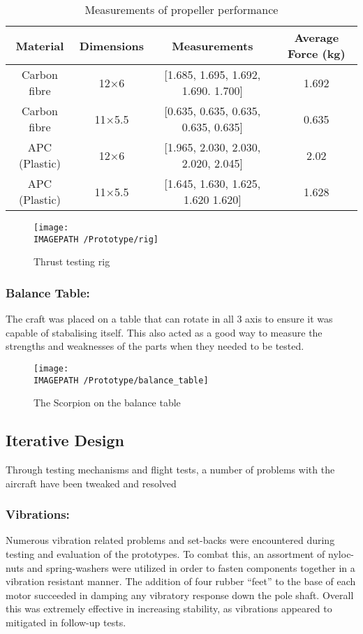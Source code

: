 \begin{table}[htbp]
	\centering
	\begin{tabular}{|c|c|c|c|}
		\hline Material & Dimensions & Measurements & Average Force (kg) \\ 
		\hline Carbon fibre & 12$\times$6 & [1.685, 1.695, 1.692, 1.690. 1.700] & 1.692 \\ 
		\hline Carbon fibre & 11$\times$5.5 & [0.635, 0.635, 0.635, 0.635, 0.635] & 0.635 \\ 
		\hline APC (Plastic) & 12$\times$6 & [1.965, 2.030, 2.030, 2.020, 2.045] & 2.02 \\ 
		\hline APC (Plastic) & 11$\times$5.5 & [1.645, 1.630, 1.625, 1.620 1.620] & 1.628 \\ 
		\hline 
	\end{tabular} 
	\caption{Measurements of propeller performance}
	\label{tab:props}
\end{table}

\begin{figure}[!h]
	\centering
	\texttt{[image: \\IMAGEPATH /Prototype/rig]}
	\caption{Thrust testing rig}
	\label{fig:rig}
\end{figure}



\subsubsection*{Balance Table:} The craft was placed on a table that can rotate in all 3 axis to ensure it was capable of stabalising itself. This also acted as a good way to measure the strengths and weaknesses of the parts when they needed to be tested. 

\begin{figure}[!h]
	\centering
	\texttt{[image: \\IMAGEPATH /Prototype/balance\_table]}
	\caption{The Scorpion on the balance table}
	\label{fig:balance_table}
\end{figure}


\subsection{Iterative Design}
Through testing mechanisms and flight tests, a number of problems with the aircraft have been tweaked and resolved

\subsubsection*{Vibrations:} Numerous vibration related problems and set-backs were encountered during testing and evaluation of the prototypes. To combat this, an assortment of nyloc-nuts and spring-washers were utilized in order to fasten components together in a vibration resistant manner. The addition of four rubber ``feet'' to the base of each motor succeeded in damping any vibratory response down the pole shaft. Overall this was extremely effective in increasing stability, as vibrations appeared to mitigated in follow-up tests.

